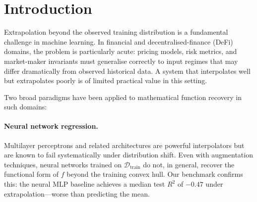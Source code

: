 \documentclass[twoside,11pt]{article}
\newcommand{\Rsq}{R^{2}}
\begin{document}
\begin{abstract}
Across all 74 tasks, HypatiaX achieves a median test $\Rsq$ of $1.00$ and a
near-perfect success rate ($\Rsq>0.99$) of \textbf{89.2\,\%}---a $+27$
percentage point gain over the LLM baseline and $+83.8$\,pp over the neural
network---while \textbf{eliminating all catastrophic failures}.
Gains scale with difficulty: $+38.1$\,pp on hard transcendental tasks (76.2\,\%
vs.\ 38.1\,\% for the LLM alone).
On the standard Nguyen-12 suite, HypatiaX achieves 11/12 recovery (91.7\,\%)
versus 10/12 for PySR-only and 0/12 for the neural baseline.
When the LLM formula is trusted (68 of 74 cases, 92\,\%), HypatiaX delivers a
$1.73\times$ median speedup over neural-network inference.
On 30 Feynman equations spanning mechanics to quantum physics, HypatiaX
achieves 9/30 near-perfect recovery versus 0/30 for the neural baseline
(Kaggle 4-vCPU run; 106/180 under the full PCA 40/60 instance pool ---
see Section~\ref{sec:feynman30}), establishing that reliability gains extend beyond the DeFi domain.
These results establish \emph{reliability under distribution shift}, not raw
accuracy, as the defining advantage of hybrid symbolic--neural systems.
\end{abstract}

\tableofcontents
\newpage

\section{Introduction}
\label{sec:intro}

Extrapolation beyond the observed training distribution is a fundamental challenge
in machine learning.  In financial and decentralised-finance (DeFi) domains, the
problem is particularly acute: pricing models, risk metrics, and market-maker
invariants must generalise correctly to input regimes that may differ dramatically
from observed historical data.  A system that interpolates well but extrapolates
poorly is of limited practical value in this setting.

Two broad paradigms have been applied to mathematical function recovery in such
domains:

\paragraph{Neural network regression.}
Multilayer perceptrons and related architectures are powerful interpolators but
are known to fail systematically under distribution shift.  Even with augmentation
techniques, neural networks trained on $\mathcal{D}_{\mathrm{train}}$ do not, in
general, recover the functional form of $f$ beyond the training convex hull.  Our
benchmark confirms this: the neural MLP baseline achieves a median test $\Rsq$ of
$-0.47$ under extrapolation---worse than predicting the mean.
\end{document}
